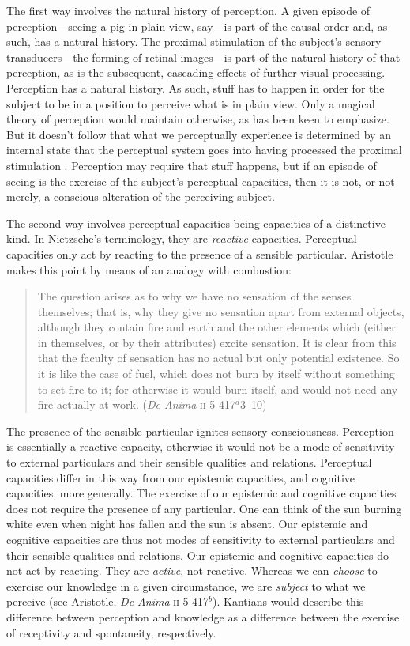 \documentclass[12pt]{article}
\begin{document}
The first way involves the natural history of perception. A given episode of perception---seeing a pig in plain view, say---is part of the causal order and, as such, has a natural history. The proximal stimulation of the subject's sensory transducers---the forming of retinal images---is part of the natural history of that perception, as is the subsequent, cascading effects of further visual processing. Perception has a natural history. As such, stuff has to happen in order for the subject to be in a position to perceive what is in plain view. Only a magical theory of perception would maintain otherwise, as \citet[]{Burge:2005uq} has been keen to emphasize. But it doesn't follow that what we perceptually experience is determined by an internal state that the perceptual system goes into having processed the proximal stimulation \citep[see][]{Campbell:2010uq,McDowell:2010fk,Travis:2011os}. Perception may require that stuff happens, but if an episode of seeing is the exercise of the subject's perceptual capacities, then it is not, or not merely, a conscious alteration of the perceiving subject.

The second way involves perceptual capacities being capacities of a distinctive kind. In Nietzsche's \citeyearpar{Nietzsche1887On-the-Genealog} terminology, they are \emph{reactive} capacities. Perceptual capacities only act by reacting to the presence of a sensible particular. Aristotle makes this point by means of an analogy with combustion:
\begin{quote}
	The question arises as to why we have no sensation of the senses themselves; that is, why they give no sensation apart from external objects, although they contain fire and earth and the other elements which (either in themselves, or by their attributes) excite sensation. It is clear from this that the faculty of sensation has no actual but only potential existence. So it is like the case of fuel, which does not burn by itself without something to set fire to it; for otherwise it would burn itself, and would not need any fire actually at work. (\emph{De Anima} \textsc{ii} 5 417\( ^{a} \)3--10)
\end{quote}
The presence of the sensible particular ignites sensory consciousness. Perception is essentially a reactive capacity, otherwise it would not be a mode of sensitivity to external particulars and their sensible qualities and relations. Perceptual capacities differ in this way from our epistemic capacities, and cognitive capacities, more generally. The exercise of our epistemic and cognitive capacities does not require the presence of any particular. One can think of the sun burning white even when night has fallen and the sun is absent. Our epistemic and cognitive capacities are thus not modes of sensitivity to external particulars and their sensible qualities and relations. Our epistemic and cognitive capacities do not act by reacting. They are \emph{active}, not reactive. Whereas we can \emph{choose} to exercise our knowledge in a given circumstance, we are \emph{subject} to what we perceive (see Aristotle, \emph{De Anima} \textsc{ii} 5 417\( ^{b} \)). Kantians would describe this difference between perception and knowledge as a difference between the exercise of receptivity and spontaneity, respectively. 
\end{document}
